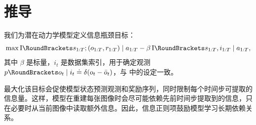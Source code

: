 \clearpage
\section{推导}
\label{sec:derivations}

我们为潜在动力学模型定义信息瓶颈目标\citep{tishby2000ib}：
\begin{equation}
\max
\MI{s_{1:T}; (o_{1:T},r_{1:T}) \mid a_{1:T}}
-\beta\,\MI{s_{1:T},i_{1:T} \mid a_{1:T}},
\end{equation}
其中 $\beta$ 是标量，$i_t$ 是数据集索引，用于确定观测 $\p(o_t|i_t)\defined\delta(o_t-\bar{o}_t)$，与 \citet{alemi2016vib} 中的设定一致。

最大化该目标会促使模型状态预测观测和奖励序列，同时限制每个时间步可提取的信息量。这样，模型在重建每张图像时会尽可能依赖先前时间步提取到的信息，只在必要时从当前图像中读取额外信息。因此，信息正则项鼓励模型学习长期依赖关系。

